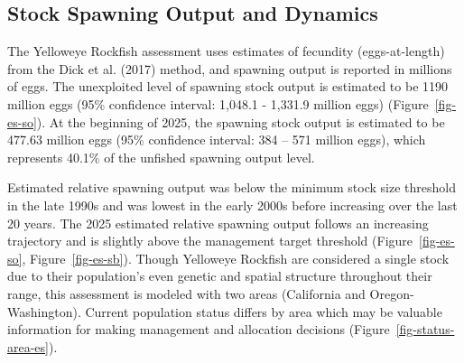 \documentclass[
]{scrartcl}
\begin{document}
\subsection*{Stock Spawning Output and
Dynamics}\label{stock-spawning-output-and-dynamics}

The Yelloweye Rockfish assessment uses estimates of fecundity
(eggs-at-length) from the Dick et al. (2017) method, and spawning output
is reported in millions of eggs. The unexploited level of spawning stock
output is estimated to be 1190 million eggs (95\% confidence interval:
1,048.1 - 1,331.9 million eggs) (Figure~\ref{fig-es-so}). At the
beginning of 2025, the spawning stock output is estimated to be 477.63
million eggs (95\% confidence interval: 384 -- 571 million eggs), which
represents 40.1\% of the unfished spawning output level.

Estimated relative spawning output was below the minimum stock size
threshold in the late 1990s and was lowest in the early 2000s before
increasing over the last 20 years. The 2025 estimated relative spawning
output follows an increasing trajectory and is slightly above the
management target threshold (Figure~\ref{fig-es-so},
Figure~\ref{fig-es-sb}). Though Yelloweye Rockfish are considered a
single stock due to their population's even genetic and spatial
structure throughout their range, this assessment is modeled with two
areas (California and Oregon-Washington). Current population status
differs by area which may be valuable information for making management
and allocation decisions (Figure~\ref{fig-status-area-es}).

\clearpage

\pagebreak

\begingroup
\fontsize{9.0pt}{10.8pt}\selectfont
\end{document}

